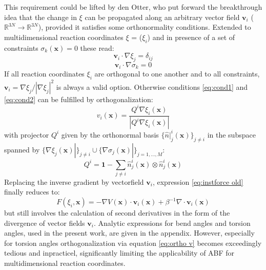 This requirement could be lifted by den Otter\autocite{den2000thermodynamic}, who put forward the breakthrough idea that the change in $\xi$ can be propagated along an arbitrary vector field $\textbf{v}_i$ ($\mathbb{R}^{3N} \to \mathbb{R}^{3N}$), provided it satisfies some orthonormality conditions.
Extended to multidimensional reaction coordinates \textbf{$\xi$} = ($\xi_i$) and in presence of a set of constraints $\sigma_{k}(\textbf{x})=0$ these read:\autocite{ciccotti2005blue}
\begin{equation}
  \textbf{v}_i \cdot \nabla \xi_j = \delta_{ij} \label{eq:cond1}
\end{equation}
\begin{equation}
  \textbf{v}_i \cdot \nabla \sigma_k = 0 \label{eq:cond2}
\end{equation}
If all reaction coordinates $\xi_i$ are orthogonal to one another and to all constraints, $\textbf{v}_i = \nabla \xi_j/|\nabla \xi_j|^2$ is always a valid option.
Otherwise conditions \ref{eq:cond1} and \ref{eq:cond2} can be fulfilled by orthogonalization:\autocite{ciccotti2005blue}
\begin{equation}
  v_i (\textbf{x}) = \frac{Q^i \nabla \xi_i (\textbf{x})}{|Q^i \nabla \xi_i (\textbf{x})|} \label{eq:ortho v}
\end{equation}
with projector $Q^i$ given by the orthonormal basis $\{\hat{n}|_{j}^{i}(\textbf{x})\}_{j\neq i}$ in the subspace spanned by $\{\nabla \xi_j (\textbf{x})|\}_{j\neq i} \cup \{\nabla\sigma_j (\textbf{x})|\}_{j=1,...,M}$:
\begin{equation}
  Q^i = \textbf{1} - \sum_{j \neq i} \hat{n}_{j}^{i}(\textbf{x}) \otimes \hat{n}_{j}^{i}(\textbf{x})
\end{equation}
Replacing the inverse gradient by vectorfield $\textbf{v}_i$, expression \ref{eq:instforce old} finally reduces to:
\begin{equation}
  F(\xi_i,\textbf{x}) = -\nabla V(\textbf{x}) \cdot \textbf{v}_i(\textbf{x}) + \beta^{-1} \nabla \cdot \textbf{v}_i(\textbf{x})
\end{equation}
but still involves the calculation of second derivatives in the form of the divergence of vector fields $\textbf{v}_i$.\autocite{comer2015adaptive} Analytic expressions for bend angles and torsion angles, used in the present work, are given in the appendix. However, especially for torsion angles orthogonalization via equation \ref{eq:ortho v} becomes exceedingly tedious and inpracticel, significantly limiting the applicability of ABF for multidimensional reaction coordinates.

